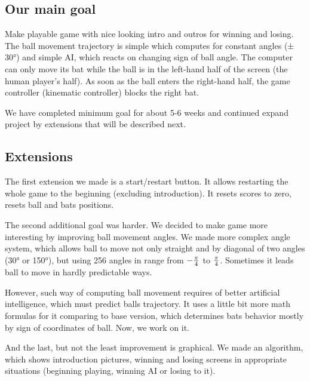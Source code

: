 \documentclass[12pt,a4paper]{article}
\begin{document}
    \subsection{Our main goal}
    Make playable game with nice looking intro and outros for winning and losing. The ball movement trajectory is simple which computes for constant angles (± 30°) and simple AI, which reacts on changing sign of ball angle. The computer can only move its bat while the ball is in the left-hand half of the screen (the human player’s half). As soon as the ball enters the right-hand half, the game controller (kinematic controller) blocks the right bat.

    We have completed minimum goal for about 5-6 weeks and continued expand project by extensions that will be described next.

    \subsection{Extensions}
    The first extension we made is a start/restart button. It allows restarting the whole game to the beginning (excluding introduction). It resets scores to zero, resets ball and bats positions.

    The second additional goal was harder. We decided to make game more interesting by improving ball movement angles. We made more complex angle system, which allows ball to move not only straight and by diagonal of two angles (30° or 150°), but using 256 angles in range from $-{\pi\over4}$ to $\pi\over4$. Sometimes it leads ball to move in hardly predictable ways.

    However, such way of computing ball movement requires of better artificial intelligence, which must predict balls trajectory. It uses a little bit more math formulas for it comparing to base version, which determines bats behavior mostly by sign of coordinates of ball. Now, we work on it.

    And the last, but not the least improvement is graphical. We made an algorithm, which shows introduction pictures, winning and losing screens in appropriate situations (beginning playing, winning AI or losing to it).
\end{document}
